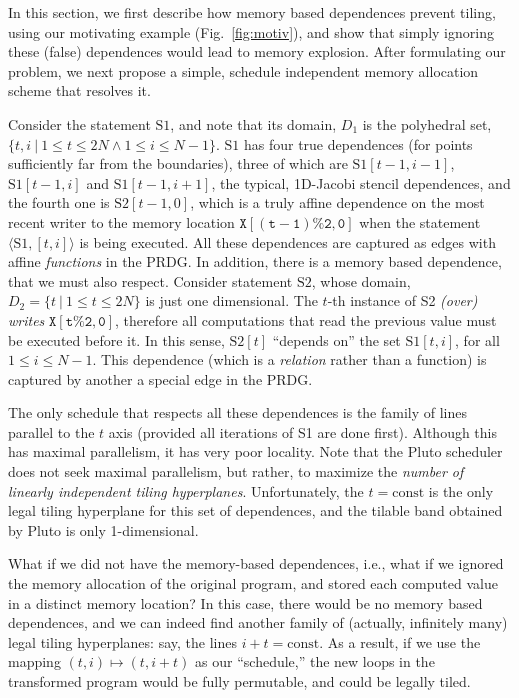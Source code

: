 In this section, we first describe how memory based dependences prevent
tiling, using our motivating example (Fig.~\ref{fig:motiv}), and show that
simply ignoring these (false) dependences would lead to memory explosion.
After formulating our problem, we next propose a simple, schedule independent
memory allocation scheme that resolves it.

Consider the statement $\mathrm{S1}$, and note that its domain, $D_1$ is the
polyhedral set, $\{t,i~|~ 1\leq t\leq 2N \wedge 1\leq i\leq N-1 \}$.
$\mathrm{S1}$ has four true dependences (for points sufficiently far from the
boundaries), three of which are $\mathrm{S1}[t-1, i-1]$, $\mathrm{S1}[t-1, i]$
and $\mathrm{S1}[t-1, i+1]$, the typical, 1D-Jacobi stencil dependences, and
the fourth one is $\mathrm{S2}[t-1, 0]$, which is a truly affine dependence on
the most recent writer to the memory location $\mathtt{X[(t-1)\%2,0]}$ when
the statement $\langle \mathrm{S1}, [t, i]\rangle$ is being executed.  All
these dependences are captured as edges with affine \emph{functions} in the
PRDG.  In addition, there is a memory based dependence, that we must also
respect.  Consider statement $\mathrm{S2}$, whose domain, $D_2 = \{t~|~ 1\leq
t\leq 2N\}$ is just one dimensional.  The $t$-th instance of S2 \emph{(over)
  writes} $\mathtt{X[t\%2, 0]}$, therefore all computations that read the
previous value must be executed before it.  In this sense, $\mathrm{S2}[t]$
``depends on'' the set $\mathrm{S1}[t,i]$, for all $1\leq i\leq N-1$.  This
dependence (which is a \emph{relation} rather than a function) is captured by
another a special edge in the PRDG.

The only schedule that respects all these dependences is the family of lines
parallel to the $t$ axis (provided all iterations of S1 are done first).
Although this has maximal parallelism, it has very poor locality.  Note that
the Pluto scheduler does not seek maximal parallelism, but rather, to maximize
the \emph{number of linearly independent tiling hyperplanes}.  Unfortunately,
the $t=\mathrm{const}$ is the only legal tiling hyperplane for this set of
dependences, and the tilable band obtained by Pluto is only 1-dimensional.

What if we did not have the memory-based dependences, i.e., what if we ignored
the memory allocation of the original program, and stored each computed value
in a distinct memory location?  In this case, there would be no memory based
dependences, and we can indeed find another family of (actually, infinitely
many) legal tiling hyperplanes: say, the lines $i+t=\mathrm{const}$.  As a
result, if we use the mapping $(t,i) \mapsto (t,i+t)$ as our ``schedule,'' the
new loops in the transformed program would be fully permutable, and could be
legally tiled.


